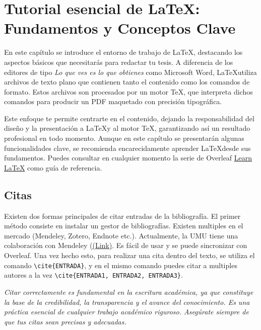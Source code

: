 \chapter[Tutorial esencial de LaTeX: Fundamentos y Conceptos Clave]{Tutorial esencial de LaTeX: Fundamentos y Conceptos Clave}
\label{cp:latex-tutorial}

{
\parindent0pt

En este capítulo se introduce el entorno de trabajo de \LaTeX, destacando los aspectos básicos que necesitarás para redactar tu tesis. A diferencia de los editores de tipo \textit{Lo que ves es lo que obtienes} como Microsoft Word, \LaTeX utiliza archivos de texto plano que contienen tanto el contenido como los comandos de formato. Estos archivos son procesados por un motor TeX, que interpreta dichos comandos para producir un PDF maquetado con precisión tipográfica.

Este enfoque te permite centrarte en el contenido, dejando la responsabilidad del diseño y la presentación a \LaTeX y al motor TeX, garantizando así un resultado profesional en todo momento. Aunque en este capítulo se presentarán algunas funcionalidades clave, se recomienda encarecidamente aprender \LaTeX desde sus fundamentos. Puedes consultar en cualquier momento la serie de Overleaf \href{https://www.overleaf.com/learn/latex/Learn_LaTeX_in_30_minutes}{Learn LaTeX} como guía de referencia.
}

\section{Citas}
\label{sec:citations}

Existen dos formas principales de citar entradas de la bibliografía. El primer método consiste en instalar un gestor de bibliografías. Existen multiples en el mercado (Mendeley, Zotero, Endnote etc.). Actualmente, la UMU tiene una colaboración con Mendeley (\href{https://www.um.es/web/biblioteca/novedades/-/asset_publisher/XFPBg3QULTgS/content/acceso-a-mendeley-institutional-edition}{(Link)}. Es fácil de usar y se puede sincronizar con Overleaf. 
Una vez hecho esto, para realizar una cita dentro del texto, se utiliza el comando \verb|\cite{ENTRADA}|, y en el mismo comando puedes citar a multiples autores a la vez \verb|\cite{ENTRADA1, ENTRADA2, ENTRADA3}|. 

\begin{block}[tip]
\textit{Citar correctamente es fundamental en la escritura académica, ya que constituye la base de la credibilidad, la transparencia y el avance del conocimiento. Es una práctica esencial de cualquier trabajo académico riguroso. Asegúrate siempre de que tus citas sean precisas y adecuadas.}
\end{block}

